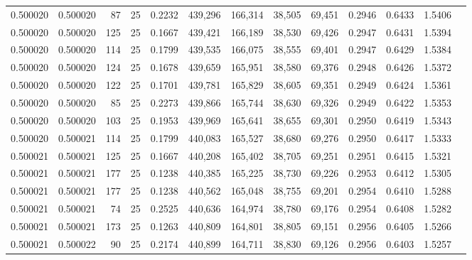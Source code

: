 \begin{tabular}{rrrrrrrrrrrrr}
0.500020 & 0.500020 &    87 &  25 &                                     0.2232 & 439,296 & 166,314 &  38,505 &  69,451 & 0.2946 & 0.6433 & 1.5406 \\
0.500020 & 0.500020 &   125 &  25 &                                     0.1667 & 439,421 & 166,189 &  38,530 &  69,426 & 0.2947 & 0.6431 & 1.5394 \\
0.500020 & 0.500020 &   114 &  25 &                                     0.1799 & 439,535 & 166,075 &  38,555 &  69,401 & 0.2947 & 0.6429 & 1.5384 \\
0.500020 & 0.500020 &   124 &  25 &                                     0.1678 & 439,659 & 165,951 &  38,580 &  69,376 & 0.2948 & 0.6426 & 1.5372 \\
0.500020 & 0.500020 &   122 &  25 &                                     0.1701 & 439,781 & 165,829 &  38,605 &  69,351 & 0.2949 & 0.6424 & 1.5361 \\
0.500020 & 0.500020 &    85 &  25 &                                     0.2273 & 439,866 & 165,744 &  38,630 &  69,326 & 0.2949 & 0.6422 & 1.5353 \\
0.500020 & 0.500020 &   103 &  25 &                                     0.1953 & 439,969 & 165,641 &  38,655 &  69,301 & 0.2950 & 0.6419 & 1.5343 \\
0.500020 & 0.500021 &   114 &  25 &                                     0.1799 & 440,083 & 165,527 &  38,680 &  69,276 & 0.2950 & 0.6417 & 1.5333 \\
0.500021 & 0.500021 &   125 &  25 &                                     0.1667 & 440,208 & 165,402 &  38,705 &  69,251 & 0.2951 & 0.6415 & 1.5321 \\
0.500021 & 0.500021 &   177 &  25 &                                     0.1238 & 440,385 & 165,225 &  38,730 &  69,226 & 0.2953 & 0.6412 & 1.5305 \\
0.500021 & 0.500021 &   177 &  25 &                                     0.1238 & 440,562 & 165,048 &  38,755 &  69,201 & 0.2954 & 0.6410 & 1.5288 \\
0.500021 & 0.500021 &    74 &  25 &                                     0.2525 & 440,636 & 164,974 &  38,780 &  69,176 & 0.2954 & 0.6408 & 1.5282 \\
0.500021 & 0.500021 &   173 &  25 &                                     0.1263 & 440,809 & 164,801 &  38,805 &  69,151 & 0.2956 & 0.6405 & 1.5266 \\
0.500021 & 0.500022 &    90 &  25 &                                     0.2174 & 440,899 & 164,711 &  38,830 &  69,126 & 0.2956 & 0.6403 & 1.5257 \\

\end{tabular}
